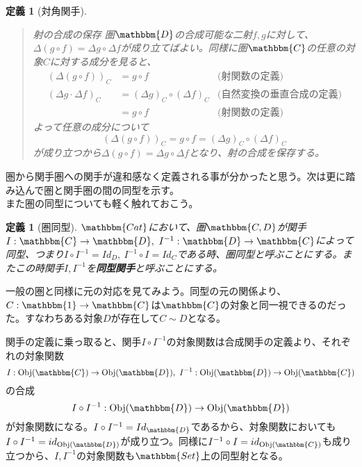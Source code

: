 \documentclass[uplatex,dvipdfmx]{jsarticle}
\newcommand{\cat}[1]{\mathbbm{#1}}
\newcommand{\arrow}{\rightarrow}
\newcommand{\functor}[3]{#1:\cat{#2}\arrow \cat{#3}}
\newcommand{\obj}[1]{\mathrm{Obj}(\cat{#1})}
\newcommand{\mor}[3]{#1:#2\arrow #3}
\newtheorem{define}[proof]{定義}
\numberwithin{proof}{subsection}
\newenvironment{mydescription}
{\begin{description}
  \setlength{\parskip}{0.5cm}
}
{\end{description}}
\begin{document}
\begin{define}[対角関手]
\begin{quote}
\begin{mydescription}
				\item[射の合成の保存] 圏$\cat{D}$の合成可能な二射$f,g$に対して、$\varDelta(g\circ f)=\varDelta g\circ \varDelta f$が成り立てばよい。同様に圏$\cat{C}$の任意の対象$C$に対する成分を見ると、
        \begin{align*}
          (\varDelta(g\circ f))_C&=g\circ f&\text{(射関数の定義)}\\
          (\varDelta g\cdot\varDelta f)_C &= (\varDelta g)_C\circ (\varDelta f)_C&\text{(自然変換の垂直合成の定義)}\\
          &=g\circ f&\text{(射関数の定義)}
        \end{align*}
        よって任意の成分について\[(\varDelta(g\circ f))_C=g\circ f=(\varDelta g)_C\circ (\varDelta f)_C\]が成り立つから$\varDelta(g\circ f)=\varDelta g\circ \varDelta f$となり、射の合成を保存する。
			\end{mydescription}
		\end{quote}
  \end{define}

  圏から関手圏への関手が違和感なく定義される事が分かったと思う。次は更に踏み込んで圏と関手圏の間の同型を示す。\\
  また圏の同型についても軽く触れておこう。
  \begin{define}[圏同型]
    $\cat{Cat}$において、圏$\cat{C,D}$が関手$\functor{I}{C}{D},\ \functor{I^{-1}}{D}{C}$によって同型、つまり$I\circ I^{-1}=Id_D,\ I^{-1}\circ I=Id_C$である時、圏同型と呼ぶことにする。またこの時関手$I,I^{-1}$を\textbf{同型関手}と呼ぶことにする。
  \end{define}
  一般の圏と同様に元の対応を見てみよう。同型の元の関係より、$\functor{C}{1}{C}$は$\cat{C}$の対象と同一視できるのだった。すなわちある対象$D$が存在して$C\sim D$となる。\\

  \begin{center}
  \end{center}
  関手の定義に乗っ取ると、関手$I\circ I^{-1}$の対象関数は合成関手の定義より、それぞれの対象関数\[\mor{I}{\obj{C}}{\obj{D}},\ \mor{I^{-1}}{\obj{D}}{\obj{C}}\]の合成\[\mor{I\circ I^{-1}}{\obj{D}}{\obj{D}}\]が対象関数になる。$I\circ I^{-1}=Id_\cat{D}$であるから、対象関数においても$I\circ I^{-1}=id_{\obj{D}}$が成り立つ。同様に$I^{-1}\circ I=id_{\obj{C}}$も成り立つから、$I,I^{-1}$の対象関数も$\cat{Set}$上の同型射となる。
\end{document}
